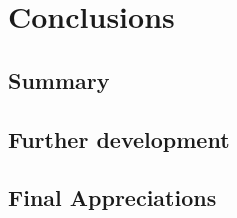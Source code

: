 \chapter{Conclusions}
\label{chapter:conclusions}


\section{Summary}
\label{sec:summary}


\section{Further development}
\label{sec:further-development}


\section{Final Appreciations}
\label{sec:final-appreciations}


